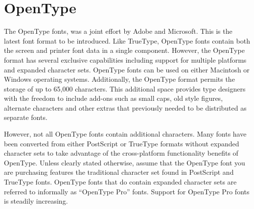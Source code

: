 \section{OpenType}

\begin{multicols}{2}
The OpenType fonts, was a joint effort by Adobe and Microsoft. This  is the latest font format to be introduced. Like TrueType, OpenType fonts contain both the screen and printer font data in a single component. However, the OpenType format has several exclusive capabilities including support for multiple platforms and expanded character sets. OpenType fonts can be used on either Macintosh or Windows operating systems. Additionally, the OpenType format permits the storage of up to 65,000 characters. This additional space provides type designers with the freedom to include add-ons such as small caps, old style figures, alternate characters and other extras that previously needed to be distributed as separate fonts.

However, not all OpenType fonts contain additional characters. Many fonts have been converted from either PostScript or TrueType formats without expanded character sets to take advantage of the cross-platform functionality benefits of OpenType. Unless clearly stated otherwise, assume that the OpenType font you are purchasing features the traditional character set found in PostScript and TrueType fonts. OpenType fonts that do contain expanded character sets are referred to informally as “OpenType Pro” fonts. Support for OpenType Pro fonts is steadily increasing. 
\end{multicols}

\clearpage


